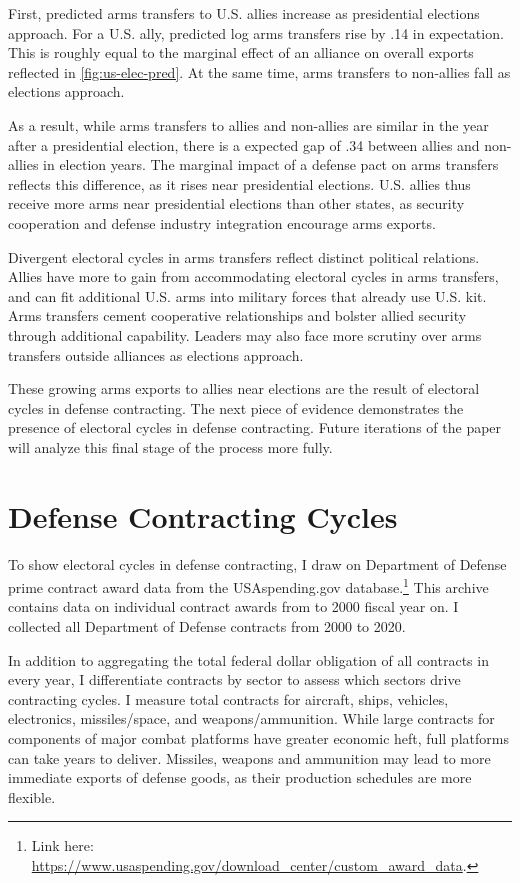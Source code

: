 \documentclass[12pt]{article}
\begin{document}
First, predicted arms transfers to U.S. allies increase as presidential elections approach.
For a U.S. ally, predicted log arms transfers rise by .14 in expectation. 
This is roughly equal to the marginal effect of an alliance on overall exports reflected in \autoref{fig:us-elec-pred}.
At the same time, arms transfers to non-allies fall as elections approach. 


As a result, while arms transfers to allies and non-allies are similar in the year after a presidential election, there is a expected gap of .34 between allies and non-allies in election years.
The marginal impact of a defense pact on arms transfers reflects this difference, as it rises near presidential elections.
U.S. allies thus receive more arms near presidential elections than other states, as security cooperation and defense industry integration encourage arms exports.


Divergent electoral cycles in arms transfers reflect distinct political relations.
Allies have more to gain from accommodating electoral cycles in arms transfers, and can fit additional U.S. arms into military forces that already use U.S. kit.
Arms transfers cement cooperative relationships and bolster allied security through additional capability.
Leaders may also face more scrutiny over arms transfers outside alliances as elections approach. 


These growing arms exports to allies near elections are the result of electoral cycles in defense contracting. 
The next piece of evidence demonstrates the presence of electoral cycles in defense contracting.  
Future iterations of the paper will analyze this final stage of the process more fully. 



\section{Defense Contracting Cycles}


To show electoral cycles in defense contracting, I draw on Department of Defense prime contract award data from the USAspending.gov database.\footnote{Link here: \url{https://www.usaspending.gov/download_center/custom_award_data}.} 
This archive contains data on individual contract awards from to 2000 fiscal year on.
I collected all Department of Defense contracts from 2000 to 2020.


In addition to aggregating the total federal dollar obligation of all contracts in every year, I differentiate contracts by sector to assess which sectors drive contracting cycles. 
I measure total contracts for aircraft, ships, vehicles, electronics, missiles/space, and weapons/ammunition. 
While large contracts for components of major combat platforms have greater economic heft, full platforms can take years to deliver. 
Missiles, weapons and ammunition may lead to more immediate exports of defense goods, as their production schedules are more flexible.
\end{document}
